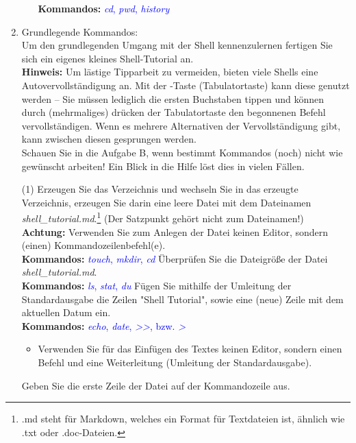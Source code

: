 \documentclass[paper=a4,fontsize=11pt]{scrartcl}%
\numberwithin{equation}{section}
\begin{document}
\begin{enumerate}
\begin{itemize}
		\textbf{Kommandos:} \textcolor{blue}{\emph{cd}, \emph{pwd}, \emph{history}}
	\end{itemize}
  \item Grundlegende Kommandos:\\
  Um den grundlegenden Umgang mit der Shell kennenzulernen fertigen Sie sich ein eigenes kleines Shell-Tutorial an.\\
  \textbf{Hinweis:} Um lästige Tipparbeit zu vermeiden, bieten viele Shells eine Autovervollständigung an. Mit der \keys{\tab}-Taste (Tabulatortaste) kann diese genutzt werden -- Sie müssen lediglich die ersten Buchstaben tippen und können durch (mehrmaliges) drücken der Tabulatortaste den begonnenen Befehl vervollständigen. Wenn es mehrere Alternativen der Vervollständigung gibt, kann zwischen diesen gesprungen werden.\\
  Schauen Sie in die Aufgabe B, wenn bestimmt Kommandos (noch) nicht wie gewünscht arbeiten! Ein Blick in die Hilfe löst dies in vielen Fällen.
        \begin{tasks}(1)
        \task Erzeugen Sie das Verzeichnis  und wechseln Sie in das erzeugte Verzeichnis, erzeugen Sie darin eine leere Datei mit dem Dateinamen \textit{shell\_tutorial.md}.\footnote{.md steht für Markdown, welches ein Format für Textdateien ist, ähnlich wie .txt oder .doc-Dateien.} (Der Satzpunkt gehört nicht zum Dateinamen!)\\
        \textbf{Achtung:} Verwenden Sie zum Anlegen der Datei keinen Editor, sondern (einen) Kommandozeilenbefehl(e).\\
        \textbf{Kommandos:} \textcolor{blue}{\emph{touch}, \emph{mkdir}, \emph{cd}}
		\task Überprüfen Sie die Dateigröße der Datei \textit{shell\_tutorial.md}.\\
		\textbf{Kommandos:} \textcolor{blue}{\emph{ls}, \emph{stat}, \emph{du}}
		\task Fügen Sie mithilfe der Umleitung der Standardausgabe die Zeilen "Shell Tutorial", sowie eine (neue) Zeile mit dem aktuellen Datum ein.\\
		\textbf{Kommandos:} \textcolor{blue}{\emph{echo}, \emph{date}, \emph{>>}, bzw. \emph{>}}
		\begin{itemize}
			\item \small Verwenden Sie für das Einfügen des Textes keinen Editor, sondern einen Befehl und eine Weiterleitung (Umleitung der Standardausgabe).
		\end{itemize}
		\task Geben Sie die erste Zeile der Datei auf der Kommandozeile aus.\\

\end{tasks}
\end{enumerate}
\end{document}
